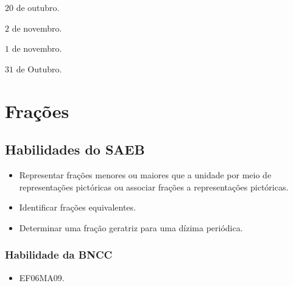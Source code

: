 \begin{escolha}
\item $20$ de outubro.
\item $2$ de novembro.
\item $1$ de novembro.
\item $31$ de Outubro.
\end{escolha}



\chapter{Frações}

\section*{Habilidades do SAEB}
\begin{itemize}
\item Representar frações menores ou maiores que a
unidade por meio de representações pictóricas ou associar frações a
representações pictóricas.
\item
  Identificar frações equivalentes.
\item
  Determinar uma fração geratriz para uma dízima periódica.
\end{itemize}

\subsection{Habilidade da BNCC} 
\begin{itemize}
\item EF06MA09.
\end{itemize}

